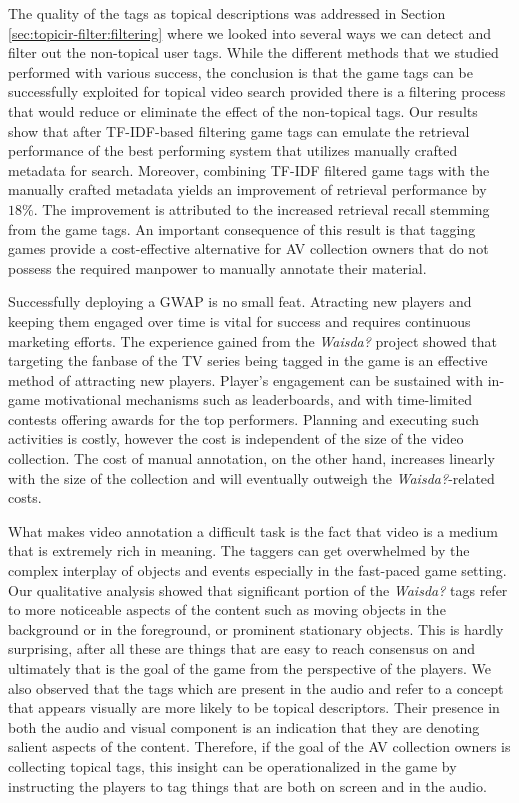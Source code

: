 The quality of the tags as topical descriptions was addressed in Section \ref{sec:topicir-filter:filtering} where we looked into several ways we can detect and filter out the non-topical user tags. While the different methods that we studied performed with various success, the conclusion is that the game tags can be successfully exploited for topical video search provided there is a filtering process that would reduce or eliminate the effect of the non-topical tags. Our results show that after TF-IDF-based filtering game tags can emulate the retrieval performance of the best performing system that utilizes manually crafted metadata for search. Moreover, combining TF-IDF filtered game tags with the manually crafted metadata  yields an improvement of retrieval performance by $18\%$. The improvement is attributed to the increased retrieval recall stemming from the game tags. An important consequence of this result is that tagging games provide a cost-effective alternative for AV collection owners that do not possess the required manpower to manually annotate their material.

Successfully deploying a GWAP is no small feat. Atracting new players and keeping them engaged over time is vital for success and requires continuous marketing efforts. The experience gained from the \textit{Waisda?} project showed that targeting the fanbase of the TV series being tagged in the game is an effective method of attracting new players. Player’s engagement can be sustained with in-game motivational mechanisms such as leaderboards, and with time-limited contests offering awards for the top performers. Planning and executing such activities is costly, however the cost is independent of the size of the video collection.  The cost of manual annotation, on the other hand, increases linearly with the size of the collection and will eventually outweigh the \textit{Waisda?}-related costs.

What makes video annotation a difficult task is the fact that video is a medium that is extremely rich in meaning. The taggers can get overwhelmed by the complex interplay of objects and events especially in the fast-paced game setting. Our qualitative analysis showed that significant portion of the \textit{Waisda?}
tags refer to more noticeable aspects of the content such as moving objects in the background or in the foreground, or prominent stationary objects. This is hardly surprising, after all these are things that are easy to reach consensus on and ultimately that is the goal of the game from the perspective of the players. We also observed that the tags which are present in the audio and refer to a concept that appears visually are more likely to be topical descriptors. Their presence in both the audio and visual component is an indication that they are denoting salient aspects of the content. Therefore, if the goal of the AV collection owners is collecting topical tags, this insight can be operationalized in the game by instructing the players to tag things that are both on screen and in the audio.

